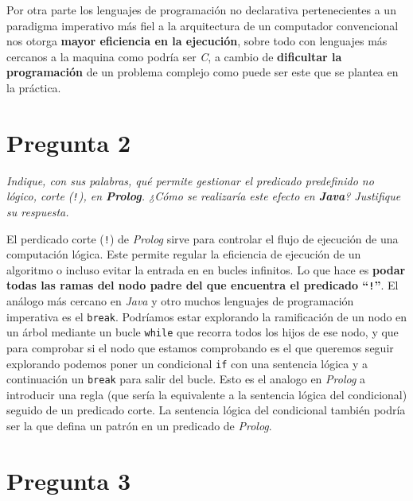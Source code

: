 \documentclass[a4paper, 12pt]{article}
\begin{document}
        Por otra parte los lenguajes de programación no declarativa 
        pertenecientes a un paradigma imperativo más fiel a la arquitectura de 
        un computador convencional nos otorga \textbf{mayor eficiencia en la 
        ejecución}, sobre todo con lenguajes más cercanos a la maquina como
        podría ser \textit{C}, a cambio de \textbf{dificultar la programación} 
        de un problema complejo como puede ser este que se plantea en la 
        práctica.\\\mbox{}

    \section{Pregunta 2}

        \textit{Indique, con sus palabras, qué permite gestionar el predicado 
        predefinido no lógico, corte (\texttt{!}), en \textbf{Prolog}. ¿Cómo se realizaría
        este efecto en \textbf{Java}? Justifique su respuesta.}\\\mbox{}

        El perdicado corte (\texttt{!}) de \textit{Prolog} sirve para controlar el flujo
        de ejecución de una computación lógica. Este permite regular la 
        eficiencia de ejecución de un algoritmo o incluso evitar la entrada en 
        en bucles infinitos. Lo que hace es \textbf{podar todas las ramas del
        nodo padre del que encuentra el predicado ``\texttt{!}''}. El análogo más cercano
        en \textit{Java} y otro muchos lenguajes de programación imperativa es 
        el \texttt{break}. Podríamos estar explorando la ramificación de un nodo
        en un árbol mediante un bucle \texttt{while} que recorra todos los hijos
        de ese nodo, y que para comprobar si el nodo que estamos comprobando es 
        el que queremos seguir explorando podemos poner un condicional 
        \texttt{if} con una sentencia lógica y a continuación un \texttt{break}
        para salir del bucle. Esto es el analogo en \textit{Prolog} a introducir
        una regla (que sería la equivalente a la sentencia lógica del 
        condicional) seguido de un predicado corte. La sentencia lógica del 
        condicional también podría ser la que defina un patrón en un predicado 
        de \textit{Prolog}.\\\mbox{}

    \section{Pregunta 3}
\end{document}
